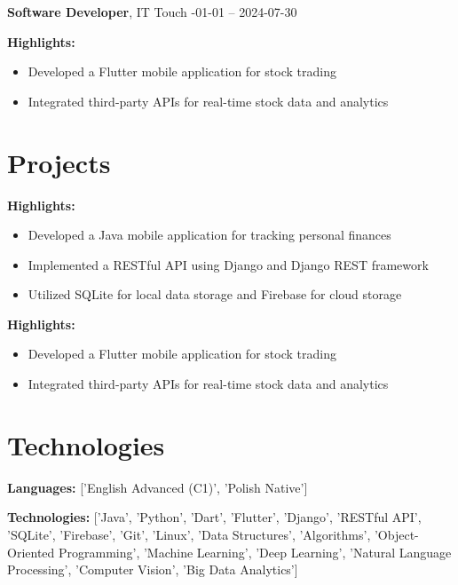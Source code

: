 \documentclass[10pt, letterpaper]{article}
\begin{document}
\begin{paracol}{2}
\noindent\textbf{Software Developer}, IT Touch -01-01 -- 2024-07-30
\end{paracol}

\vspace{5pt}

\noindent\textbf{Highlights:}
\begin{itemize}
    
    \item Developed a Flutter mobile application for stock trading
    
    \item Integrated third-party APIs for real-time stock data and analytics
    
\end{itemize}


\section*{Projects}

\noindent\textbf{}

\vspace{5pt}

\noindent\textbf{Highlights:}
\begin{itemize}
    
    \item Developed a Java mobile application for tracking personal finances
    
    \item Implemented a RESTful API using Django and Django REST framework
    
    \item Utilized SQLite for local data storage and Firebase for cloud storage
    
\end{itemize}

\noindent\textbf{}

\vspace{5pt}

\noindent\textbf{Highlights:}
\begin{itemize}
    
    \item Developed a Flutter mobile application for stock trading
    
    \item Integrated third-party APIs for real-time stock data and analytics
    
\end{itemize}


\section*{Technologies}
\noindent\textbf{Languages:} ['English Advanced (C1)', 'Polish Native']

\vspace{5pt}

\noindent\textbf{Technologies:} ['Java', 'Python', 'Dart', 'Flutter', 'Django', 'RESTful API', 'SQLite', 'Firebase', 'Git', 'Linux', 'Data Structures', 'Algorithms', 'Object-Oriented Programming', 'Machine Learning', 'Deep Learning', 'Natural Language Processing', 'Computer Vision', 'Big Data Analytics']
\end{document}

